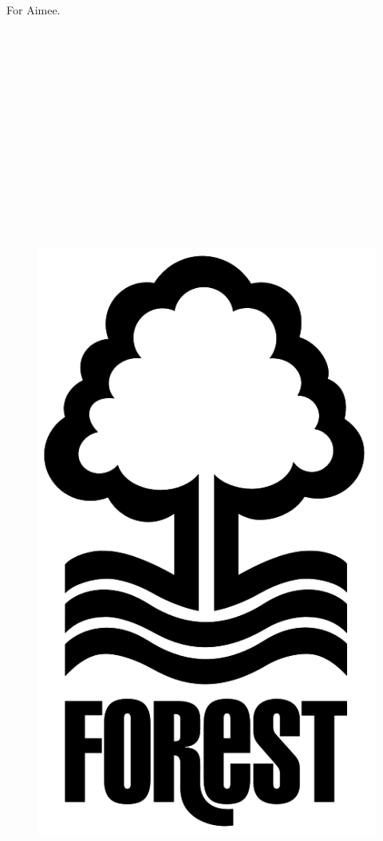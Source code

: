 \documentclass[12pt]{report}
\begin{document}
For Aimee.
\\
\\
\\
\\
\\
\\
\\
\\
\\
\\
\\
\\
\\
\\
\\

\begin{figure}[H]
\centering
\includegraphics[scale=0.1]{images/nffc_logo.png}
\label{fig:nffc_logo}
\end{figure}
\end{document}
